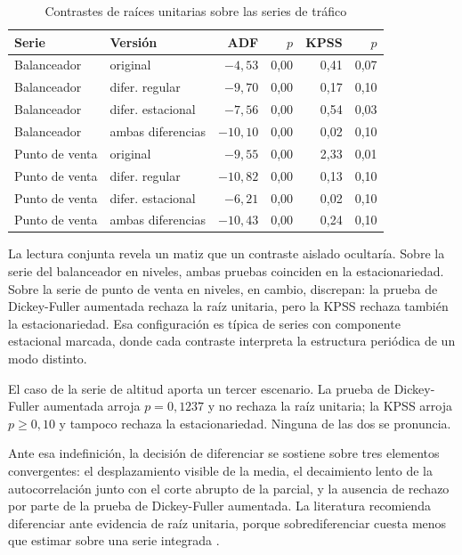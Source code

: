 \begin{table}[htbp]
\centering
\caption{Contrastes de raíces unitarias sobre las series de tráfico}
\label{tab:raices}
\small
\begin{tabular}{llrrrr}
\toprule
\textbf{Serie} & \textbf{Versión} & \textbf{ADF} & \textbf{$p$} & \textbf{KPSS} & \textbf{$p$} \\
\midrule
Balanceador & original & $-4{,}53$ & 0,00 & 0,41 & 0,07 \\
Balanceador & difer. regular & $-9{,}70$ & 0,00 & 0,17 & 0,10 \\
Balanceador & difer. estacional & $-7{,}56$ & 0,00 & 0,54 & 0,03 \\
Balanceador & ambas diferencias & $-10{,}10$ & 0,00 & 0,02 & 0,10 \\
\addlinespace
Punto de venta & original & $-9{,}55$ & 0,00 & 2,33 & 0,01 \\
Punto de venta & difer. regular & $-10{,}82$ & 0,00 & 0,13 & 0,10 \\
Punto de venta & difer. estacional & $-6{,}21$ & 0,00 & 0,02 & 0,10 \\
Punto de venta & ambas diferencias & $-10{,}43$ & 0,00 & 0,24 & 0,10 \\
\bottomrule
\end{tabular}
\end{table}

La lectura conjunta revela un matiz que un contraste aislado ocultaría. Sobre la serie del
balanceador en niveles, ambas pruebas coinciden en la estacionariedad. Sobre la serie de punto
de venta en niveles, en cambio, discrepan: la prueba de Dickey-Fuller aumentada rechaza la
raíz unitaria, pero la KPSS rechaza también la estacionariedad. Esa configuración es típica de series con componente estacional marcada, donde cada contraste interpreta la estructura periódica de un modo distinto.

El caso de la serie de altitud aporta un tercer escenario. La prueba de Dickey-Fuller aumentada
arroja $p = 0{,}1237$ y no rechaza la raíz unitaria; la KPSS arroja $p \geq 0{,}10$ y tampoco
rechaza la estacionariedad. Ninguna de las dos se pronuncia.

Ante esa indefinición, la decisión de diferenciar se sostiene sobre tres elementos
convergentes: el desplazamiento visible de la media, el decaimiento lento de la autocorrelación
junto con el corte abrupto de la parcial, y la ausencia de rechazo por parte de la prueba de
Dickey-Fuller aumentada. La literatura recomienda diferenciar ante evidencia de raíz unitaria,
porque sobrediferenciar cuesta menos que estimar sobre una serie integrada \parencite{hyndman2021}.

